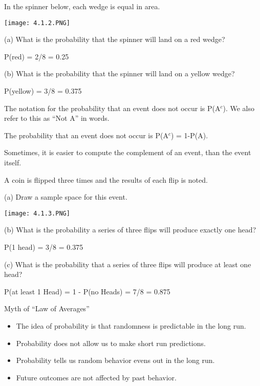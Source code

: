 \documentclass[../stats.tex]{subfiles}
\begin{document}
\begin{example}
    In the spinner below, each wedge is equal in area.
    \begin{center}
        \texttt{[image: 4.1.2.PNG]}
    \end{center}

    (a) What is the probability that the spinner will land on a red wedge?

    P(red) = 2/8 = 0.25 

    (b) What is the probability that the spinner will land on a yellow wedge?

    P(yellow) = 3/8 = 0.375
\end{example}

The notation for the probability that an event does not occur is P(A$^c$). We also refer to this as ``Not A'' in words.

The probability that an event does not occur is P(A$^c$) = 1-P(A).

Sometimes, it is easier to compute the complement of an event, than the event itself.

\pagebreak
\begin{example}
    A coin is flipped three times and the results of each flip is noted.

    (a) Draw a sample space for this event.
    \begin{center}
        \texttt{[image: 4.1.3.PNG]}
    \end{center}

    (b) What is the probability a series of three flips will produce exactly one head?

    P(1 head) = 3/8 = 0.375

    (c) What is the probability that a series of three flips will produce at least one head?

    P(at least 1 Head) = 1 - P(no Heads) = 7/8 = 0.875
\end{example}

Myth of ``Law of Averages''
\begin{itemize}
    \item The idea of probability is that randomness is predictable in the long run.
    \item Probability does not allow us to make short run predictions.
    \item Probability tells us random behavior evens out in the long run.
    \item Future outcomes are not affected by past behavior.
\end{itemize}
\end{document}
